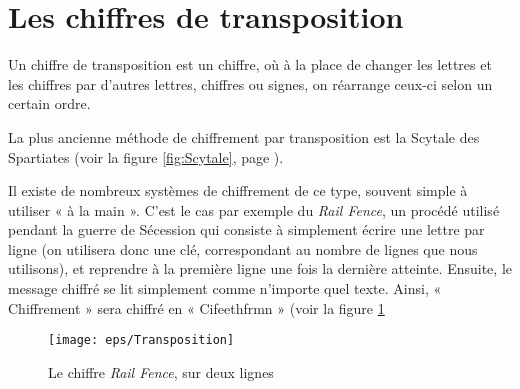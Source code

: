 \section{Les chiffres de transposition}
Un chiffre de transposition est un chiffre, où à la place de changer
les lettres et les chiffres par d'autres lettres, chiffres ou signes,
on réarrange ceux-ci selon un certain ordre.

La plus ancienne méthode de chiffrement par transposition est la
Scytale des Spartiates (voir la figure \ref{fig:Scytale}, page
\pageref{fig:Scytale}).

Il existe de nombreux systèmes de chiffrement de ce type, souvent
simple à utiliser « à la main ». C'est le cas par exemple du
\emph{Rail Fence}, un procédé utilisé pendant la guerre de Sécession
qui consiste à simplement écrire une lettre par ligne (on utilisera donc
une clé, correspondant au nombre de lignes que nous utilisons), et
reprendre à la première ligne une fois la dernière atteinte. Ensuite,
le message chiffré se lit simplement comme n'importe quel texte.
Ainsi, « Chiffrement » sera chiffré en « Cifeethfrmn » (voir la figure \ref{fig:Transposition}
\begin{figure}[h]
  \begin{center}
    \texttt{[image: eps/Transposition]}
  \end{center}
  \caption{Le chiffre \emph{Rail Fence}, sur deux lignes}
  \label{fig:Transposition}
\end{figure}

